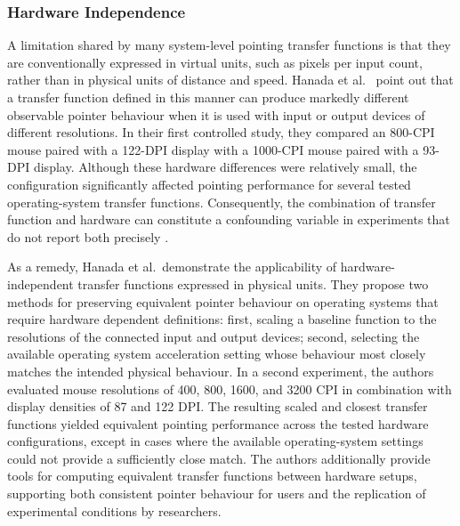 \documentclass[12pt,a4paper]{report}
\begin{document}
        \subsubsection{Hardware Independence}

        A limitation shared by many system-level pointing transfer functions is that they are conventionally expressed in virtual units, such as pixels per input count, rather than in physical units of distance and speed. Hanada et al.\ \citeauthor{hanada2021relevance} point out that a transfer function defined in this manner can produce markedly different observable pointer behaviour when it is used with input or output devices of different resolutions. In their first controlled study, they compared an 800-CPI mouse paired with a 122-DPI display with a 1000-CPI mouse paired with a 93-DPI display. Although these hardware differences were relatively small, the configuration significantly affected pointing performance for several tested operating-system transfer functions. Consequently, the combination of transfer function and hardware can constitute a confounding variable in experiments that do not report both precisely \cite{hanada2021relevance}.

        As a remedy, Hanada et al.\ demonstrate the applicability of hardware-independent transfer functions expressed in physical units. They propose two methods for preserving equivalent pointer behaviour on operating systems that require hardware dependent definitions: first, scaling a baseline function to the resolutions of the connected input and output devices; second, selecting the available operating system acceleration setting whose behaviour most closely matches the intended physical behaviour. In a second experiment, the authors evaluated mouse resolutions of 400, 800, 1600, and 3200 CPI in combination with display densities of 87 and 122 DPI. The resulting scaled and closest transfer functions yielded equivalent pointing performance across the tested hardware configurations, except in cases where the available operating-system settings could not provide a sufficiently close match. The authors additionally provide tools for computing equivalent transfer functions between hardware setups, supporting both consistent pointer behaviour for users and the replication of experimental conditions by researchers\cite{hanada2021relevance}.
\end{document}

